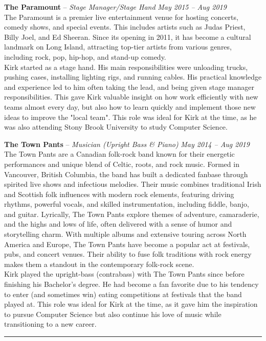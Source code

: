 \documentclass[10pt,letterpaper]{article}
\begin{document}
\headedsection
{\textbf{The Paramount} -- \textit{Stage Manager/Stage Hand}}
{\textit{May 2015 -- Aug 2019}} { \\

	The Paramount is a premier live entertainment venue for hosting concerts, comedy shows, and special events. This includes artists such as Judas Priest, Billy Joel, and Ed Sheeran. Since its opening in 2011, it has become a cultural landmark on Long Island, attracting top-tier artists from various genres, including rock, pop, hip-hop, and stand-up comedy. \\

	Kirk started as a stage hand. His main responsibilities were unloading trucks, pushing cases, installing lighting rigs, and running cables. His practical knowledge and experience led to him often taking the lead, and being given stage manager responsibilities. This gave Kirk valuable insight on how work efficiently with new teams almost every day, but also how to learn quickly and implement those new ideas to improve the "local team". This role was ideal for Kirk at the time, as he was also attending Stony Brook University to study Computer Science. \\
}

\headedsection
{\textbf{The Town Pants} -- \textit{Musician (Upright Bass \& Piano)}}
{\textit{May 2014 -- Aug 2019}} { \\

	The Town Pants are a Canadian folk-rock band known for their energetic performances and unique blend of Celtic, roots, and rock music. Formed in Vancouver, British Columbia, the band has built a dedicated fanbase through spirited live shows and infectious melodies. Their music combines traditional Irish and Scottish folk influences with modern rock elements, featuring driving rhythms, powerful vocals, and skilled instrumentation, including fiddle, banjo, and guitar. Lyrically, The Town Pants explore themes of adventure, camaraderie, and the highs and lows of life, often delivered with a sense of humor and storytelling charm. With multiple albums and extensive touring across North America and Europe, The Town Pants have become a popular act at festivals, pubs, and concert venues. Their ability to fuse folk traditions with rock energy makes them a standout in the contemporary folk-rock scene. \\

	Kirk played the upright-bass (contrabass) with The Town Pants since before finishing his Bachelor's degree. He had become a fan favorite due to his tendency to enter (and sometimes win) eating competitions at festivals that the band played at. This role was ideal for Kirk at the time, as it gave him the inspiration to pursue Computer Science but also continue his love of music while transitioning to a new career. \\
}
\begin{center}\hrule\end{center}
\end{document}
